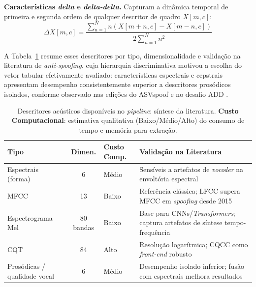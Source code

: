 \documentclass[12pt,a4paper]{article}
\begin{document}
\textbf{Características \textit{delta} e \textit{delta-delta}.} Capturam a
dinâmica temporal de primeira e segunda ordem de qualquer descritor de
quadro $X[m,c]$:
\begin{equation}
\label{eq:delta}
\Delta X[m,c] = \frac{\displaystyle\sum_{n=1}^{N}n(X[m+n,c]-X[m-n,c])}
                     {2\displaystyle\sum_{n=1}^{N}n^2}
\end{equation}

A Tabela~\ref{tab:ranking_features} resume esses descritores por tipo,
dimensionalidade e validação na literatura de \textit{anti-spoofing}, cuja
hierarquia discriminativa motivou a escolha do vetor tabular efetivamente
avaliado: características espectrais e cepstrais apresentam desempenho
consistentemente superior a descritores prosódicos isolados, conforme
observado nas edições do ASVspoof
\cite{sahidullah2015comparison, todisco2016new, todisco2019asvspoof} e no
desafio ADD \cite{yi2022add}.

\begin{table}[H]
\centering
\caption{Descritores acústicos disponíveis no \textit{pipeline}: síntese da
literatura. \textbf{Custo Computacional}: estimativa qualitativa
(Baixo/Médio/Alto) do consumo de tempo e memória para extração.}
\label{tab:ranking_features}
\small\singlespacing
\setlength{\tabcolsep}{4pt}
\begin{tabular}{p{2.8cm}cp{1.8cm}p{4.1cm}}
\toprule
\textbf{Tipo} & \textbf{Dimen.} & \textbf{Custo Comp.} &
\textbf{Validação na Literatura} \\
\midrule
Espectrais (forma)
  & 6 & Médio
  & Sensíveis a artefatos de \textit{vocoder} na envoltória
    espectral~\cite{todisco2016new} \\
\addlinespace
MFCC
  & 13 & Baixo
  & Referência clássica; LFCC supera MFCC em \textit{spoofing}
    desde 2015~\cite{sahidullah2015comparison, todisco2019asvspoof} \\
\addlinespace
Espectrograma Mel
  & 80 bandas & Baixo
  & Base para CNNs/\textit{Transformers}; captura artefatos de
    síntese tempo-frequência~\cite{jung2022aasist, tak2021rawnet2} \\
\addlinespace
CQT
  & 84 & Alto
  & Resolução logarítmica; CQCC como \textit{front-end}
    robusto~\cite{todisco2016new} \\
\addlinespace
Prosódicas / qualidade vocal
  & 6 & Médio
  & Desempenho isolado inferior; fusão com espectrais melhora
    resultados~\cite{yi2022add} \\
\bottomrule
\end{tabular}
\end{table}
\end{document}
